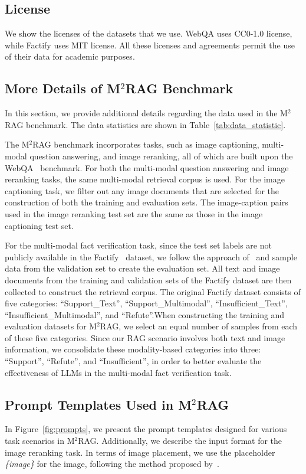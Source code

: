 
\subsection{License}
We show the licenses of the datasets that we use. WebQA uses CC0-1.0 license, while Factify uses MIT license.
All these licenses and agreements permit the use of their data for academic purposes.

\subsection{More Details of M$^2$RAG Benchmark}
In this section, we provide additional details regarding the data used in the M$^2$RAG benchmark. The data statistics are shown in Table~\ref{tab:data_statistic}.


The M$^2$RAG benchmark incorporates tasks, such as image captioning, multi-modal question answering, and image reranking, all of which are built upon the WebQA~\cite{chang2022webqa} benchmark. For both the multi-modal question answering and image reranking tasks, the same multi-modal retrieval corpus is used. For the image captioning task, we filter out any image documents that are selected for the construction of both the training and evaluation sets. The image-caption pairs used in the image reranking test set are the same as those in the image captioning test set.


For the multi-modal fact verification task, since the test set labels are not publicly available in the Factify~\cite{mishra2022factify} dataset, we follow the approach of~\citet{tahmasebi2024multimodal} and sample data from the validation set to create the evaluation set. All text and image documents from the training and validation sets of the Factify dataset are then collected to construct the retrieval corpus. The original Factify dataset consists of five categories: ``Support\_Text'', ``Support\_Multimodal'', ``Insufficient\_Text'', ``Insufficient\_Multimodal'', and ``Refute''.When constructing the training and evaluation datasets for M$^2$RAG, we select an equal number of samples from each of these five categories. Since our RAG scenario involves both text and image information, we consolidate these modality-based categories into three: ``Support'', ``Refute'', and ``Insufficient'', in order to better evaluate the effectiveness of LLMs in the multi-modal fact verification task.

\subsection{Prompt Templates Used in M$^2$RAG}\label{app:prompt} 
In Figure~\ref{fig:prompts}, we present the prompt templates designed for various task scenarios in M$^2$RAG. Additionally, we describe the input format for the image reranking task. In terms of image placement, we use the placeholder \emph{\{image\}} for the image, following the method proposed by~\citet{hu2024mrag}.

